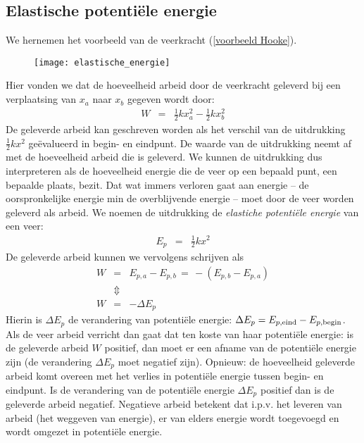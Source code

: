 \documentclass{ximera}
\begin{document}
	
	\subsection{Elastische potenti\"ele energie}\label{elastische
	potentiele energie}
	
	We hernemen het voorbeeld van de veerkracht (\ref{voorbeeld Hooke}).
	\begin{figure}[h]
	\begin{center}
	\texttt{[image: elastische\_energie]}
	\end{center}
	\end{figure}



	Hier vonden we dat de hoeveelheid arbeid door de veerkracht geleverd
	bij een verplaatsing van $x_a$ naar $x_b$ gegeven wordt door:
	\begin{eqnarray*}
	W&=&\frac{1}{2}kx_ a^2-\frac{1}{2}kx_ b^2
	\end{eqnarray*}
	De geleverde arbeid kan geschreven worden als het verschil van de uitdrukking $\frac{1}{2}kx^2$ ge\"evalueerd in begin- en eindpunt. De waarde van de uitdrukking neemt af met de hoeveelheid arbeid die is geleverd. We kunnen de uitdrukking dus interpreteren als de hoeveelheid energie die de veer op een bepaald punt, een bepaalde plaats, bezit. Dat wat immers verloren gaat aan energie -- de oorspronkelijke energie min de overblijvende energie -- moet door de veer worden geleverd als arbeid. We noemen de uitdrukking de \textit{elastiche potenti\"ele energie} van een veer:
	\begin{eqnarray}
	E_p&=&\frac{1}{2}kx^2\label{Ep=1/2kx^2}
	\end{eqnarray}
	De geleverde arbeid kunnen we vervolgens schrijven als
	\begin{eqnarray*}
	W&=&E_{p,a}-E_{p,b}\,=\,-(E_{p,b}-E_{p,a})\\
	&\Updownarrow&\\
	W&=&-\Delta E_p
	\end{eqnarray*}
	Hierin is $\Delta E_p$ de verandering van potenti\"ele energie: $\Delta E_p=E_{p,\rm eind}-E_{p,\rm begin}$. Als de veer arbeid verricht dan gaat dat ten koste van haar potenti\"ele energie: is de geleverde arbeid $W$ positief, dan moet er een afname van de potenti\"ele energie zijn (de verandering $\Delta E_p$ moet negatief zijn). Opnieuw: de hoe\-veel\-heid geleverde arbeid komt overeen met het verlies in potenti\"ele energie tussen begin- en eindpunt. Is de verandering van de potenti\"ele energie $\Delta E_p$ positief dan is de geleverde arbeid negatief. Negatieve arbeid betekent dat i.p.v. het leveren van arbeid (het weggeven van energie), er van elders energie wordt toegevoegd en wordt omgezet in potenti\"ele energie.
	
\end{document}
